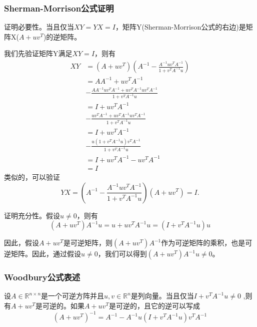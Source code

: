 \documentclass[twoside,twocolumn]{article}
\begin{document}
\begin{CJK*}{UTF8}{gkai}
\subsubsection{Sherman-Morrison公式证明}
证明必要性。当且仅当$XY=YX=I$，矩阵Y(Sherman-Morrison公式的右边)是矩阵X($A+uv^{T}$)的逆矩阵。

我们先验证矩阵Y满足$XY=I$，则有
\begin{equation*}
	\begin{aligned}
		XY
		&=(A+uv^{T})\left(A^{-1}-\frac{A^{-1}uv^{T}A^{-1}}{ 1+v^{T}A^{-1}u}\right)\\
		&=AA^{-1}+uv^{T}A^{-1}\\&-\frac{AA^{-1}uv^{T}A^{-1}+uv^{T}A^{-1}uv^{T}A^{-1}}{ 1+v^{T}A^{-1}u}\\
		&=I+uv^{T}A^{-1}\\&-\frac{uv^{T}A^{-1}+uv^{T}A^{-1}uv^{T}A^{-1}}{ 1+v^{T}A^{-1}u}\\
		&=I+uv^{T}A^{-1}\\&-\frac{u(1+v^{T}A^{-1}u)v^{T}A^{-1}}{ 1+v^{T}A^{-1}u}\\
		&=I+uv^{T}A^{-1}-uv^{T}A^{-1}\\
		&=I
	\end{aligned}
\end{equation*}
类似的，可以验证
\begin{equation*} YX=\left(A^{-1}-\frac{A^{-1}uv^{T}A^{-1}}{ 1+v^{T}A^{-1}u}\right)(A+uv^{T})=I. 
\end{equation*}

证明充分性。假设$u\neq 0$，则有
\begin{equation*}
	(A+uv^{T})A^{-1}u=u+uv^{T}A^{-1}u=(I+v^{T}A^{-1}u)u
\end{equation*}

因此，假设$A+uv^{T}$是可逆矩阵，则$(A+uv^{T})A^{-1}$作为可逆矩阵的乘积，也是可逆矩阵。因此，通过假设$u\neq 0$，我们可以得到$(A+uv^{T})A^{-1}u\neq 0$。
\subsubsection{Woodbury公式表述}
设$A\in \mathbb{R}^{n\times n}$是一个可逆方阵并且$u,v\in \mathbb{R}^{n}$是列向量。当且仅当$I+v^{T}A^{-1}u\neq 0$ ,则有$A+uv^{T}$是可逆的。如果$A+uv^{T}$是可逆的，且它的逆可以写成
\begin{equation*}
	(A+uv^{T})^{-1}=A^{-1}-A^{-1}u(I+v^{T}A^{-1}u)v^{T}A^{-1}
\end{equation*}

\end{CJK*}
\end{document}
